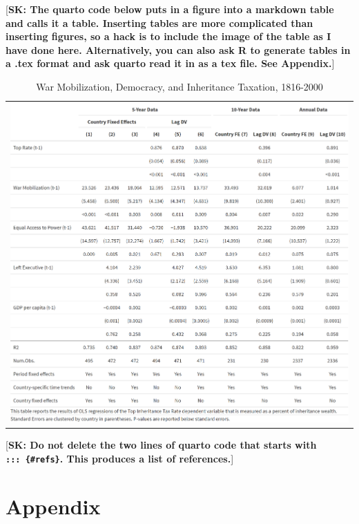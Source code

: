 \documentclass[12pt, ]{article}
\newenvironment{CSLReferences}[2]{

\clearpage
}{}
\begin{document}
{[}\textbf{SK: The quarto code below puts in a figure into a markdown
table and calls it a table. Inserting tables are more complicated than
inserting figures, so a hack is to include the image of the table as I
have done here. Alternatively, you can also ask R to generate tables in
a .tex format and ask quarto read it in as a tex file. See Appendix.}{]}

\hypertarget{tbl-main}{}
\begin{longtable}[]{@{}l@{}}
\caption{\label{tbl-main}War Mobilization, Democracy, and Inheritance
Taxation, 1816-2000}\tabularnewline
\toprule\noalign{}
\endfirsthead
\endhead
\bottomrule\noalign{}
\endlastfoot
\includegraphics{figures/image3.png} \\
\end{longtable}

{[}\textbf{SK: Do not delete the two lines of quarto code that starts
with \texttt{:::\ \{\#refs\}}. This produces a list of references.}{]}

\hypertarget{refs}{}

\begin{CSLReferences}{0}{0}\end{CSLReferences}

\appendix

\hypertarget{appendix}{%
\section{Appendix}\label{appendix}}
\end{document}
